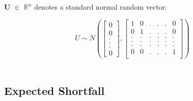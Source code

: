 \documentclass[12pt]{article}
\begin{document}
$\mathbf{U}$  $\in$ $\mathbb{R}^{n}$ denotes a standard normal random vector:

 
 
 
\begin{equation}
   U \sim N(
   \begin{bmatrix}0\\0\\.\\.\\.\\0\end{bmatrix},  
   \begin{bmatrix}
     1 & 0 &.&.&.&0\\
     0 & 1&.&.&.&0\\
     . & .&.&.&.&.\\
     . & .&.&.&.&.\\
     . & .&.&.&.&.\\
     0 & 0&.&.&.&1\\
   \end{bmatrix})   
\label{eq_fosdfijsdf8493}   
\end{equation}\\
 









\subsection{Expected Shortfall}
\end{document}
